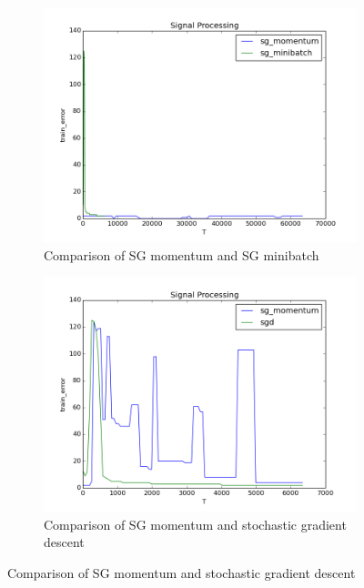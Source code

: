 \documentclass{article}
\begin{document}
\begin{figure}
	\centering
	\begin{subfigure}[b]{0.45\textwidth} 
		\includegraphics[width=\textwidth]{../results/signal_processing0.png}
		\caption{Comparison of SG momentum and SG minibatch}
		\label{fig11}
	\end{subfigure}
	\begin{subfigure}[b]{0.45\textwidth} 
		\includegraphics[width=\textwidth]{../results/signal_processing1.png}
		\caption{Comparison of SG momentum and stochastic gradient descent}
		\label{fig12}
	\end{subfigure}
\end{figure}
\end{document}
